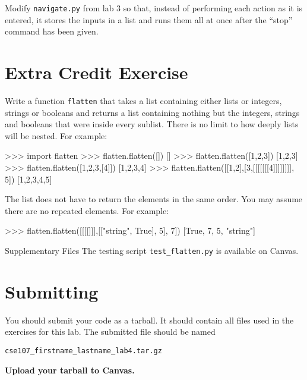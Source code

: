 \documentclass[11pt]{cselabheader}
\begin{document}
\begin{ex}[navigate2.py] Modify \texttt{navigate.py} from lab 3 so that,
  instead of performing each action as it is entered, it stores the inputs in a
  list and runs them all at once after the ``stop'' command has been given.
\end{ex}

\section{Extra Credit Exercise}

\begin{extraex}[flatten.py]
Write a function \texttt{flatten} that takes a list containing either
lists or integers, strings or booleans and returns a list containing
nothing but the integers, strings and booleans that were inside every
sublist. There is no limit to how deeply lists will be nested.
For example:

\begin{pyconcode}
>>> import flatten
>>> flatten.flatten([])
[]
>>> flatten.flatten([1,2,3])
[1,2,3]
>>> flatten.flatten([1,2,3,[4]])
[1,2,3,4]
>>> flatten.flatten([[1,2],[3,[[[[[[[4]]]]]]]], 5])
[1,2,3,4,5]
\end{pyconcode}

The list does not have to return the elements in the same order.
You may assume there are no repeated elements.
For example:
\begin{pyconcode}
>>> flatten.flatten([[[[]]],[["string", True], 5], 7])
[True, 7, 5, "string"]
\end{pyconcode}
\end{extraex}

\begin{infobox}{Supplementary Files}
The testing script \texttt{test\_flatten.py} is available on Canvas.
\end{infobox}

\pagebreak
\section{Submitting}

You should submit your code as a tarball. It should contain all files
used in the exercises for this lab. The submitted file should be named
\begin{center}
  \texttt{cse107\_firstname\_lastname\_lab4.tar.gz}
\end{center}

\begin{center}
  \textbf{Upload your tarball to Canvas.}
\end{center}

\listexercises
\listextraexercises
\end{document}
